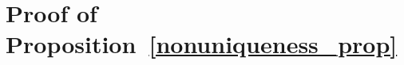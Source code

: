 \documentclass{article}
\newcommand{\x}{\textbf{x}}
\begin{document}







\section{Proof of Proposition~\ref{nonuniqueness_prop}}

\label{non_uniqueness_appendix}
\end{document}
